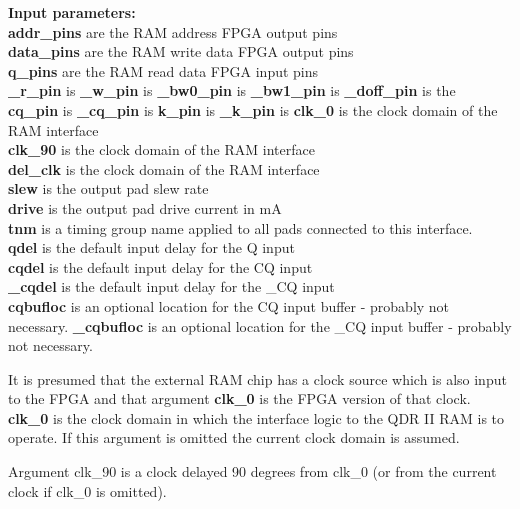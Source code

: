             {\bf Input parameters:} \\
            {\bf addr\_pins} are the RAM address FPGA output pins \\
            {\bf data\_pins} are the RAM write data FPGA output pins \\
            {\bf q\_pins} are the RAM read data FPGA input pins \\
            {\bf \_r\_pin} is 
            {\bf \_w\_pin} is 
            {\bf \_bw0\_pin} is 
            {\bf \_bw1\_pin} is 
            {\bf \_doff\_pin} is the \\
            {\bf cq\_pin} is 
            {\bf \_cq\_pin} is 
            {\bf k\_pin} is 
            {\bf \_k\_pin} is 
            {\bf clk\_0} is the clock domain of the RAM interface \\
            {\bf clk\_90} is the clock domain of the RAM interface \\
            {\bf del\_clk} is the clock domain of the RAM interface \\
            {\bf slew} is the output pad slew rate \\
            {\bf drive} is the output pad drive current in mA \\
            {\bf tnm} is a timing group name applied to all pads
            connected to this interface. \\
            {\bf qdel} is the default input delay for the Q input \\
            {\bf cqdel} is the default input delay for the CQ input \\
            {\bf \_cqdel} is the default input delay for the \_CQ input \\
            {\bf cqbufloc} is an optional location for the CQ input buffer -
            probably not necessary.
            {\bf \_cqbufloc} is an optional location for the \_CQ input buffer -
            probably not necessary.
                       
            It is presumed that the external RAM chip has a clock source
            which is also input to the FPGA and that argument {\bf clk\_0}
            is the FPGA version of that clock. {\bf clk\_0} is the clock
            domain in which the interface logic to the QDR II RAM is to
            operate. If this argument is omitted the current clock domain is
            assumed.
            
            Argument clk\_90 is a clock delayed 90 degrees from clk\_0 (or
            from the current clock if clk\_0 is omitted).
            
